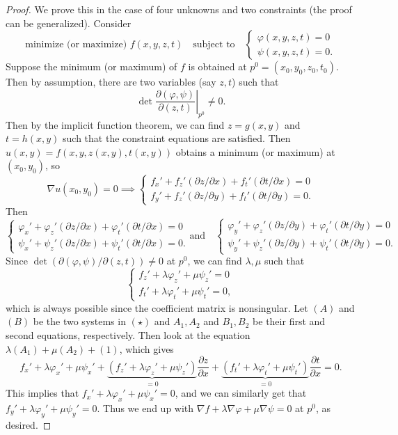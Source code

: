 \begin{proof}
  We prove this in the case of four unknowns and
  two constraints (the proof can be generalized). Consider
  \[
    \text{minimize (or maximize) $f(x, y, z, t)$}
    \quad \text{subject to}
    \quad
    \begin{cases}
      \varphi(x, y, z, t) = 0 \\
      \psi(x, y, z, t) = 0.
    \end{cases}
  \]
  Suppose the minimum (or maximum) of $f$ is obtained
  at $p^0 = (x_0, y_0, z_0, t_0)$. Then by assumption,
  there are two variables (say $z, t$) such that
  \[
    \left.\det \frac{\partial (\varphi, \psi)}{\partial (z, t)}\right|_{p^0} \ne 0.
  \]
  Then by the implicit function theorem, we can find
  $z = g(x, y)$ and $t = h(x, y)$ such that the constraint
  equations are satisfied. Then
  $u(x, y) = f(x, y, z(x, y), t(x, y))$ obtains a minimum
  (or maximum) at $(x_0, y_0)$, so
  \[
    \nabla u(x_0, y_0) = 0
    \implies
    \begin{cases}
      f_x' + f_z' (\partial z / \partial x) + f_t' (\partial t / \partial x) = 0 \\
      f_y' + f_z' (\partial z / \partial y) + f_t' (\partial t / \partial y) = 0.
    \end{cases} \tag{1, 2}
  \]
  Then
  \[
    \begin{cases}
      \varphi_x' + \varphi_z' (\partial z / \partial x) + \varphi_t' (\partial t / \partial x) = 0 \\
      \psi_x' + \psi_z' (\partial z / \partial x) + \psi_t' (\partial t / \partial x) = 0.
    \end{cases}
    \text{and} \quad
    \begin{cases}
      \varphi_y' + \varphi_z' (\partial z / \partial y) + \varphi_t' (\partial t / \partial y) = 0 \\
      \psi_y' + \psi_z' (\partial z / \partial y) + \psi_t' (\partial t / \partial y) = 0.
    \end{cases} \tag{$\star$}
  \]
  Since $\det (\partial (\varphi, \psi) / \partial (z, t)) \ne 0$
  at $p^0$, we can find $\lambda, \mu$ such that
  \[
    \begin{cases}
      f_z' + \lambda \varphi_z' + \mu \psi_z' = 0 \\
      f_t' + \lambda \varphi_t' + \mu \psi_t' = 0,
    \end{cases}
  \]
  which is always possible since the coefficient
  matrix is nonsingular.
  Let $(A)$ and $(B)$ be the two systems in $(\star)$ and
  $A_1, A_2$ and $B_1, B_2$ be their first
  and second equations, respectively. Then look at
  the equation $\lambda(A_1) + \mu(A_2) + (1)$, which gives
  \[
  f_x' + \lambda \varphi_x' + \mu \psi_x' +
  \underbrace{(f_z' + \lambda \varphi_z' + \mu \psi_z')}_{= 0} \frac{\partial z}{\partial x}
  + \underbrace{(f_t' + \lambda \varphi_t' + \mu \psi_t')}_{= 0} \frac{\partial t}{\partial x} = 0
  .\]
  This implies that $f_x' + \lambda \varphi_x' + \mu \psi_x' = 0$, and
  we can similarly get that
  $f_y' + \lambda \varphi_y' + \mu \psi_y' = 0$. Thus
  we end up with
  $\nabla f + \lambda \nabla \varphi + \mu \nabla \psi = 0$
  at $p^0$, as desired.
\end{proof}
